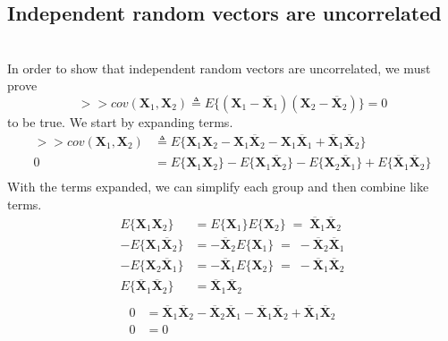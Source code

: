 \documentclass[12pt,letterpaper, onecolumn]{exam}
\begin{document}
\begin{questions}
\begin{parts}
		\part{Independent random vectors are uncorrelated}\\
		\solution
		In order to show that independent random vectors are uncorrelated, we must prove
		\[>>cov(\mathbf{X}_1,\mathbf{X}_2)\triangleq E\{(\mathbf{X}_1 - \overline{\mathbf{X}}_1)(\mathbf{X}_2 - \overline{\mathbf{X}}_2)\} = 0\]
		to be true. We start by expanding terms.
		\begin{equation}
			\begin{split}
				>>cov(\mathbf{X}_1,\mathbf{X}_2) & \triangleq E\{\mathbf{X}_1\mathbf{X}_2 - \mathbf{X}_1\overline{\mathbf{X}}_2 - \mathbf{X}_1\overline{\mathbf{X}}_1 + \overline{\mathbf{X}}_1\overline{\mathbf{X}}_2\}\\
				0 & = E\{\mathbf{X}_1\mathbf{X}_2\} - E\{\mathbf{X}_1\overline{\mathbf{X}}_2\} - E\{\mathbf{X}_2\overline{\mathbf{X}}_1\} + E\{\overline{\mathbf{X}}_1\overline{\mathbf{X}}_2\}\\
			\end{split}
		\end{equation}
		With the terms expanded, we can simplify each group and then combine like terms.
		\begin{equation}
			\begin{split}
				E\{\mathbf{X}_1\mathbf{X}_2\} & = E\{\mathbf{X}_1\}E\{\mathbf{X}_2\}\; = \;\overline{\mathbf{X}}_1\overline{\mathbf{X}}_2\\
				-E\{\mathbf{X}_1\overline{\mathbf{X}}_2\} & = -\overline{\mathbf{X}}_2E\{\mathbf{X}_1\} \; = \;-\overline{\mathbf{X}}_2\overline{\mathbf{X}}_1 \\
				-E\{\mathbf{X}_2\overline{\mathbf{X}}_1\} & = -\overline{\mathbf{X}}_1E\{\mathbf{X}_2\} \; = \;-\overline{\mathbf{X}}_1\overline{\mathbf{X}}_2 \\
				E\{\overline{\mathbf{X}}_1\overline{\mathbf{X}}_2\} & = \overline{\mathbf{X}}_1\overline{\mathbf{X}}_2\\
			\end{split}
		\end{equation}
		\begin{equation}
			\begin{split}
				0 & = \overline{\mathbf{X}}_1\overline{\mathbf{X}}_2 -\overline{\mathbf{X}}_2\overline{\mathbf{X}}_1 -\overline{\mathbf{X}}_1\overline{\mathbf{X}}_2 + \overline{\mathbf{X}}_1\overline{\mathbf{X}}_2\\
				0 & = 0\\
			\end{split}
		\end{equation}


\end{parts}
\end{questions}
\end{document}
